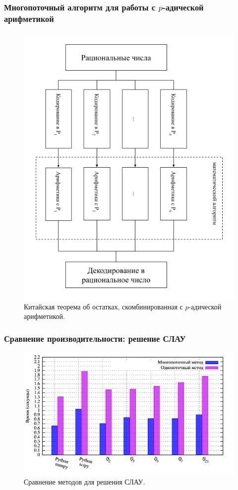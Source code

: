 \documentclass[10pt,professionalfont,utf8,presentation,compress]{beamer}
\theoremstyle{definition}
\theoremstyle{plain}
\begin{document}
\begin{frame}
\frametitle{Многопоточный алгоритм для работы с $p$-адической арифметикой}
\begin{figure}[H]
\centerline{\includegraphics[width=0.52\linewidth]{images/multi/schema.png}}
\caption{Китайская теорема об остатках, скомбинированная с $p$-адической арифметикой.}
\label{img:multi:schema}
\end{figure}
\end{frame}


\begin{frame}
\frametitle{Сравнение производительности: решение СЛАУ}
\begin{figure}[H]
\centerline{\includegraphics[width=0.95\linewidth]{../gnuplot/multi/gauss/plot.png}}
\caption{Сравнение методов для решения СЛАУ.}
\label{img:multi:gauss}
\end{figure}
\end{frame}
\end{document}
